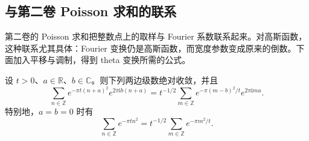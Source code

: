 \subsection{与第二卷 Poisson 求和的联系}
\label{b3:subsec:240102}

第二卷的 Poisson 求和把整数点上的取样与 Fourier 系数联系起来。对高斯函数，这种联系尤其具体：Fourier 变换仍是高斯函数，而宽度参数变成原来的倒数。下面加入平移与调制，得到 theta 变换所需的公式。

\begin{lemma}\label{b3:lem:24-gaussian-poisson}
设 \(t>0\)、\(a\in\mathbb R\)、\(b\in\mathbb C\)。则下列两边级数绝对收敛，并且
\begin{equation}\label{b3:eq:24-gaussian-poisson}
 \sum_{n\in\mathbb Z}e^{-\pi t(n+a)^2}e^{2\pi\mathrm ib(n+a)}
 =t^{-1/2}\sum_{m\in\mathbb Z}
       e^{-\pi(m-b)^2/t}e^{2\pi\mathrm ima}.
\end{equation}
特别地，\(a=b=0\) 时有
\[
 \sum_{n\in\mathbb Z}e^{-\pi tn^2}
     =t^{-1/2}\sum_{m\in\mathbb Z}e^{-\pi m^2/t}.
\]
\end{lemma}
